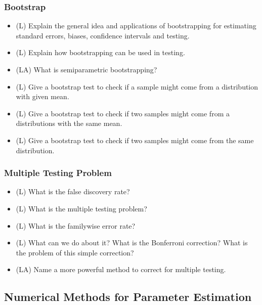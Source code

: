 \subsubsection*{Bootstrap}
\begin{itemize}
    \item (L) Explain the general idea and applications of bootstrapping for estimating standard errors, biases, confidence intervals and testing.
    \item (L) Explain how bootstrapping can be used in testing.
    \item (LA) What is semiparametric bootstrapping?
    \item (L) Give a bootstrap test to check if a sample might come from a distribution with given mean.
    \item (L) Give a bootstrap test to check if two samples might come from a distributions with the same mean.
    \item (L) Give a bootstrap test to check if two samples might come from the same distribution.
\end{itemize}

\subsubsection*{Multiple Testing Problem}
\begin{itemize}
    \item (L) What is the false discovery rate?
    \item (L) What is the multiple testing problem?
    \item (L) What is the familywise error rate?
    \item (L) What can we do about it? What is the Bonferroni correction? What is the problem of this simple correction?
    \item (LA) Name a more powerful method to correct for multiple testing.
\end{itemize}

\subsection*{Numerical Methods for Parameter Estimation}

